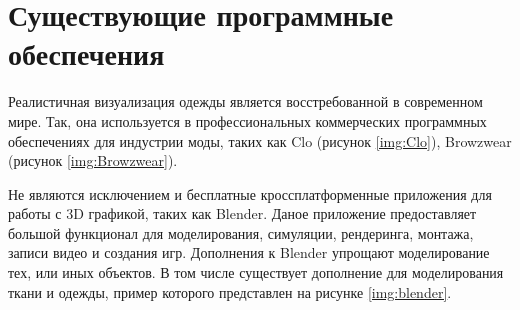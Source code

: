 %
%
%
%
%

\section{Существующие программные обеспечения}

Реалистичная визуализация одежды является восстребованной в современном мире.
Так, она используется в профессиональных коммерческих программных обеспечениях
для индустрии моды, таких как Clo\cite{site01} (рисунок \ref{img:Clo}),
Browzwear\cite{site02} (рисунок \ref{img:Browzwear}).


Не являются исключением и бесплатные кроссплатформенные приложения для работы с
3D графикой, таких как Blender. Даное приложение предоставляет большой
функционал для моделирования, симуляции, рендеринга, монтажа, записи видео и
создания игр. Дополнения к Blender упрощают моделирование тех, или иных
объектов. В том числе существует дополнение для моделирования ткани и одежды,
пример которого представлен на рисунке \ref{img:blender}.

